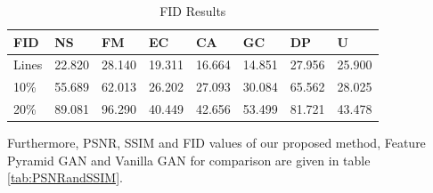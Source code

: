 \begin{table}[h!]
\centering
\begin{tabular}{@{}l|c|c|c|c|c|c|l@{}}
\textbf{FID} & \multicolumn{1}{l|}{NS} & \multicolumn{1}{l|}{FM} & \multicolumn{1}{l|}{EC} & \multicolumn{1}{l|}{CA} & \multicolumn{1}{l|}{GC} & \multicolumn{1}{l|}{DP} & U     \\ \midrule
Lines         & 22.820                  & 28.140           & 19.311                   & 16.664                    & 14.851                  & 27.956                     & 25.900 \\ \cmidrule(l){2-8} 
10\%          & 55.689                 & 62.013            & 26.202                   & 27.093                   & 30.084                 & 65.562                     & 28.025 \\ \cmidrule(l){2-8} 
20\%          & 89.081                 & 96.290                    & 40.449                   & 42.656                   & 53.499                 & 81.721                     & 43.478 \\ \bottomrule
\end{tabular}
\caption{FID Results}
\label{tab:FIDresults}
\end{table}

Furthermore, PSNR, SSIM and FID values of our proposed method, Feature Pyramid GAN and Vanilla GAN for comparison are given in table \ref{tab:PSNRandSSIM}.

\begin{table}[]
\centering
{}
\caption{SSIM, PSNR and FID Results for proposed methods}
\label{tab:PSNRandSSIM}
\end{table}